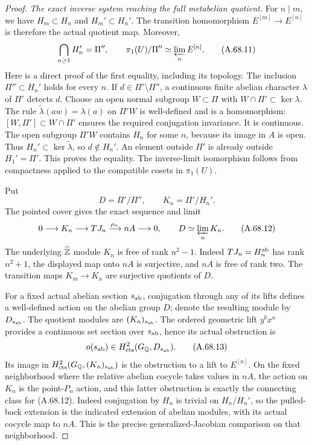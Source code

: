 \begin{proof}
\emph{The exact inverse system reaching the full metabelian quotient.}
For $n\mid m$, we have $H_m\subset H_n$ and $H_m'\subset H_n'$.
The transition homomorphism $E^{[m]}\to E^{[n]}$ is therefore the
actual quotient map.  Moreover,
\[
          \bigcap_{n\geq1}H_n'=\Pi'',\qquad
          \pi_1(U)/\Pi''\simeq\varprojlim_n E^{[n]} .
 \tag{A.68.11}
\]
Here is a direct proof of the first equality, including its topology.
The inclusion $\Pi''\subset H_n'$ holds for every $n$.
If $d\in\Pi'\setminus\Pi''$, a continuous finite abelian character
$\lambda$ of $\Pi'$ detects $d$.
Choose an open normal subgroup $W\subset\Pi$ with
$W\cap\Pi'\subset\ker\lambda$.
The rule $\widetilde\lambda(aw)=\lambda(a)$ on $\Pi'W$
is well-defined and is a homomorphism:
$[W,\Pi']\subset W\cap\Pi'$ ensures the required conjugation
invariance.  It is continuous.
The open subgroup $\Pi'W$ contains $H_n$ for some $n$, because
its image in $A$ is open.
Thus $H_n'\subset\ker\widetilde\lambda$, so $d\notin H_n'$.
An element outside $\Pi'$ is already outside $H_1'=\Pi'$.
This proves the equality.  The inverse-limit isomorphism follows
from compactness applied to the compatible cosets in $\pi_1(U)$.

Put
\[
 D=\Pi'/\Pi'',\qquad K_n=\Pi'/H_n'.
\]
The pointed cover gives the exact sequence and limit
\[
 0\longrightarrow K_n\longrightarrow TJ_n
              \xrightarrow{\rho_n}nA\longrightarrow0,
       \qquad D\simeq\varprojlim_nK_n .
 \tag{A.68.12}
\]
The underlying $\widehat{\mathbb Z}$ module $K_n$ is free of rank $n^2-1$.
Indeed $TJ_n=H_n^{\rm ab}$ has rank $n^2+1$, the displayed
map onto $nA$ is surjective, and $nA$ is free of rank two.
The transition maps $K_m\to K_n$ are surjective quotients of $D$.

For a fixed actual abelian section $s_{\rm ab}$, conjugation through
any of its lifts defines a well-defined action on the abelian group
$D$; denote the resulting module by $D_{s_{\rm ab}}$.
The quotient modules are $(K_n)_{s_{\rm ab}}$.
The ordered geometric lift $y^b x^a$ provides a continuous set
section over $s_{\rm ab}$, hence its actual obstruction is
\[
          o(s_{\rm ab})\in
             H^2_{\rm cts}(G_\mathbb Q,D_{s_{\rm ab}}).
 \tag{A.68.13}
\]
Its image in $H^2_{\rm cts}(G_\mathbb Q,(K_n)_{s_{\rm ab}})$ is the
obstruction to a lift to $E^{[n]}$.
On the fixed neighborhood where the relative abelian cocycle takes
values in $nA$, the action on $K_n$ is the point-$P_n$ action,
and this latter obstruction is exactly the connecting class for
(A.68.12).  Indeed conjugation by $H_n$ is trivial on $H_n/H_n'$,
so the pulled-back extension is the indicated extension of
abelian modules, with its actual cocycle map to $nA$.
This is the precise generalized-Jacobian comparison on that
neighborhood.


\end{proof}
